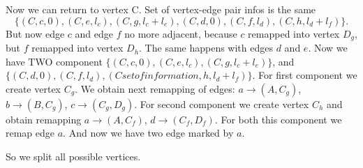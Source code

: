 \documentclass[12pt,a4paper,oneside]{article}
\begin{document}
Now we can return to vertex C. Set of vertex-edge pair infos is the
same $$\{(C,c,0), (C,e,l_c), (C,g,l_c+l_e), (C,d,0), (C,f,l_d),
(C,h,l_d+l_f)\}.$$
But now edge $c$ and edge $f$ no more adjacent, because $c$ remapped into
vertex $D_g$, but $f$ remapped into vertex $D_h$. The same happens with edges
$d$ and $e$. Now we have TWO component $\{(C,c,0), (C,e,l_c),
(C,g,l_c+l_e)\}$, and $\{(C,d,0), (C,f,l_d), (Cset of information,h,l_d+l_f)\}$. For first
component we create vertex $C_g$. We obtain next remapping of edges: $a
\rightarrow (A, C_g)$, $b \rightarrow (B, C_g)$, $c \rightarrow (C_g, D_g)$.
For second component we create vertex $C_h$ and obtain remapping $a \rightarrow
(A, C_f)$, $d \rightarrow (C_f, D_f)$. For both this component we remap edge $a$.
And now we have two edge marked by $a$.

So we split all possible vertices.
\end{document}

